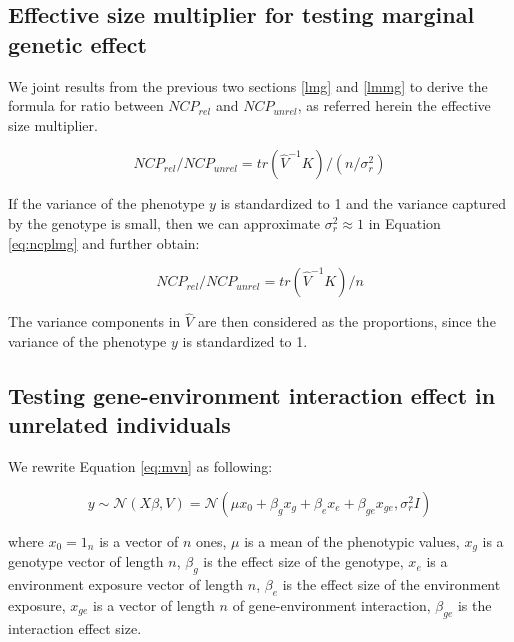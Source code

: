 \documentclass[]{book}
\begin{document}
\subsection{Effective size multiplier for testing marginal genetic
effect}\label{trfg}

We joint results from the previous two sections \ref{lmg} and \ref{lmmg}
to derive the formula for ratio between \(NCP_{rel}\) and
\(NCP_{unrel}\), as referred herein the effective size multiplier.

\begin{equation}
NCP_{rel} / NCP_{unrel} =  tr(\hat{V}^{-1} K) / (n / \sigma^2_r)
\label{eq:ncpratio}
\end{equation}

If the variance of the phenotype \(y\) is standardized to 1 and the
variance captured by the genotype is small, then we can approximate
\(\sigma_r^2 \approx 1\) in Equation \eqref{eq:ncplmg} and further obtain:

\begin{equation}
NCP_{rel} / NCP_{unrel} = tr(\hat{V}^{-1} K) / n
\label{eq:ncpratiosc}
\end{equation}

The variance components in \(\hat{V}\) are then considered as the
proportions, since the variance of the phenotype \(y\) is standardized
to 1.

\subsection{Testing gene-environment interaction effect in unrelated
individuals}\label{lmge}

We rewrite Equation \eqref{eq:mvn} as following:

\begin{equation}
  y \sim \mathcal{N} (X \beta, V) = \mathcal{N} (\mu x_0 + \beta_g x_g + \beta_e x_e + \beta_{ge} x_{ge}, \sigma_r^2 I) 
\label{eq:lmge}
\end{equation}

where \(x_0 = 1_n\) is a vector of \(n\) ones, \(\mu\) is a mean of the
phenotypic values, \(x_g\) is a genotype vector of length \(n\),
\(\beta_g\) is the effect size of the genotype, \(x_e\) is a environment
exposure vector of length \(n\), \(\beta_e\) is the effect size of the
environment exposure, \(x_{ge}\) is a vector of length \(n\) of
gene-environment interaction, \(\beta_{ge}\) is the interaction effect
size.
\end{document}
